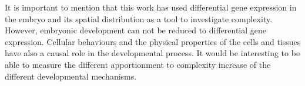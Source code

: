 It is important to mention that this work has used differential gene expression in the embryo and its spatial distribution as a tool to investigate complexity. However, embryonic development can not be reduced to differential gene expression. Cellular behaviours and the physical properties of the cells and tissues have also a causal role in the developmental process. It would be interesting to be able to measure the different apportionment to complexity increase of the different developmental mechanisms.
%
%
%
%
%
